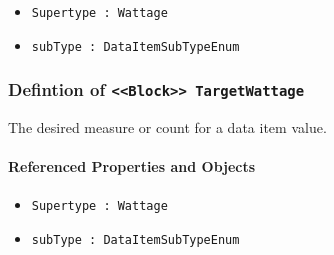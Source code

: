 \begin{itemize}
\item \texttt{Supertype : Wattage}

\item \texttt{subType : DataItemSubTypeEnum}

\end{itemize}
\FloatBarrier
\subsubsection{Defintion of \texttt{<<Block>> TargetWattage}}
  \label{type:TargetWattage}

\FloatBarrier

The desired measure or count for a data item value.

\FloatBarrier
\paragraph{Referenced Properties and Objects}

\begin{itemize}
\item \texttt{Supertype : Wattage}

\item \texttt{subType : DataItemSubTypeEnum}

\end{itemize}
\FloatBarrier
